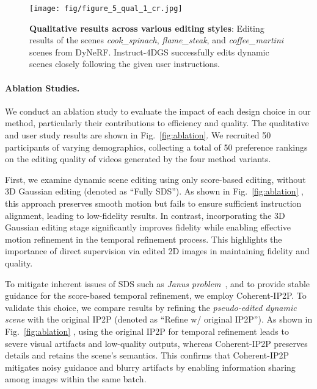 \begin{figure}[!t]
\centering
    \texttt{[image: fig/figure\_5\_qual\_1\_cr.jpg]}
    \vspace{-6mm}
    \caption{\textbf{Qualitative results across various editing styles}: Editing results of the scenes \emph{cook\_spinach}, \emph{flame\_steak}, and \emph{coffee\_martini} scenes from DyNeRF. Instruct-4DGS successfully edits dynamic scenes closely following the given user instructions.}
    \vspace{-3mm}
    \label{fig:qual_1}
\end{figure}


\vspace{-5mm}\paragraph{Ablation Studies.} 
We conduct an ablation study to evaluate the impact of each design choice in our method, particularly their contributions to efficiency and quality. The qualitative and user study results are shown in Fig.~\ref{fig:ablation}. We recruited 50 participants of varying demographics, collecting a total of 50 preference rankings on the editing quality of videos generated by the four method variants.


First, we examine dynamic scene editing using only score-based editing, without 3D Gaussian editing (denoted as ``Fully SDS''). As shown in Fig.~\ref{fig:ablation} , this approach preserves smooth motion but fails to ensure sufficient instruction alignment, leading to low-fidelity results. In contrast, incorporating the 3D Gaussian editing stage significantly improves fidelity while enabling effective motion refinement in the temporal refinement process. This highlights the importance of direct supervision via edited 2D images in maintaining fidelity and quality. 


To mitigate inherent issues of SDS such as \emph{Janus problem}~\cite{ref_20_mvdream}, and to provide stable guidance for the score-based temporal refinement, we employ Coherent-IP2P. To validate this choice, we compare results by refining the \textit{pseudo-edited dynamic scene} with the original IP2P (denoted as ``Refine w/ original IP2P''). As shown in Fig.~\ref{fig:ablation} , using the original IP2P for temporal refinement leads to severe visual artifacts and low-quality outputs, whereas Coherent-IP2P preserves details and retains the scene’s semantics. This confirms that Coherent-IP2P mitigates noisy guidance and blurry artifacts by enabling information sharing among images within the same batch.



